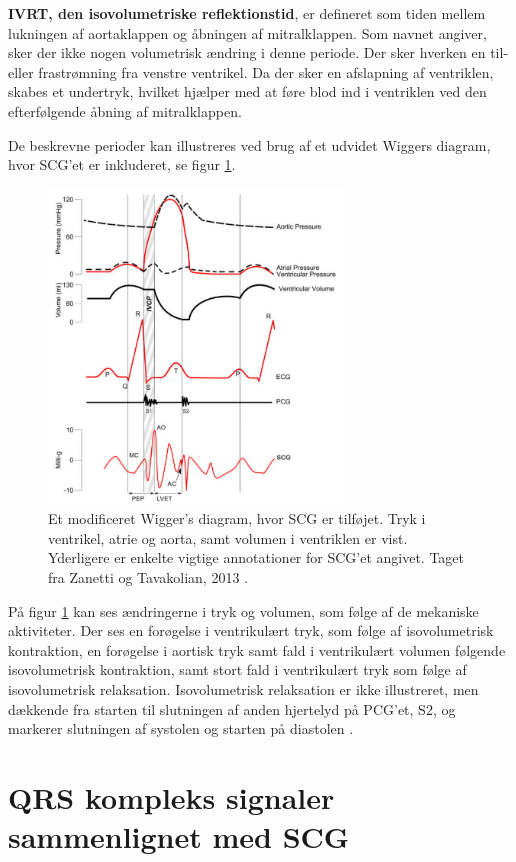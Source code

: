 \textbf{IVRT, den isovolumetriske reflektionstid}, er defineret som tiden mellem lukningen af aortaklappen og åbningen af mitralklappen. Som navnet angiver, sker der ikke nogen volumetrisk ændring i denne periode. Der sker hverken en til- eller frastrømning fra venstre ventrikel. Da der sker en afslapning af ventriklen, skabes et undertryk, hvilket hjælper med at føre blod ind i ventriklen ved den efterfølgende åbning af mitralklappen. \cite{di2013wearable}
 
De beskrevne perioder kan illustreres ved brug af et udvidet Wiggers diagram, hvor SCG’et er inkluderet, se figur \ref{wigdiagram}.

\begin{figure}[H]
\centering
  \includegraphics[width=0.7\textwidth]{Billeder/WiggersmedSCGZanetti.PNG}
   \caption{Et modificeret Wigger's diagram, hvor SCG er tilføjet. Tryk i ventrikel, atrie og aorta, samt volumen i ventriklen er vist. Yderligere er enkelte vigtige annotationer for SCG’et angivet. Taget fra Zanetti og Tavakolian, 2013 \cite{zanetti2013seismocardiography}.} 
   \label{wigdiagram}
\end{figure}

På figur \ref{wigdiagram} kan ses ændringerne i tryk og volumen, som følge af de mekaniske aktiviteter. Der ses en forøgelse i ventrikulært tryk, som følge af isovolumetrisk kontraktion, en forøgelse i aortisk tryk samt fald i ventrikulært volumen følgende isovolumetrisk kontraktion, samt stort fald i ventrikulært tryk som følge af isovolumetrisk relaksation. Isovolumetrisk relaksation er ikke illustreret, men dækkende fra starten til slutningen af anden hjertelyd på PCG’et, S2, og markerer slutningen af systolen og starten på diastolen \cite{zanetti2013seismocardiography}.




\section{QRS kompleks signaler sammenlignet med SCG }

